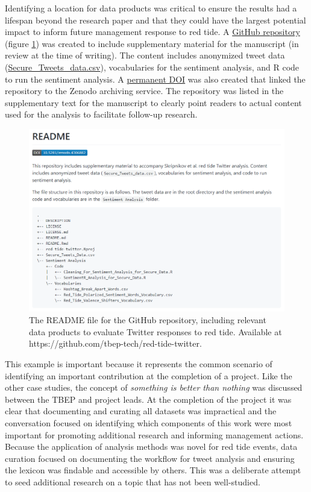 \documentclass[
]{book}
\begin{document}
Identifying a location for data products was critical to ensure the results had a lifespan beyond the research paper and that they could have the largest potential impact to inform future management response to red tide. A \href{https://github.com/tbep-tech/red-tide-twitter}{GitHub repository} (figure \ref{fig:redtidereadme}) was created to include supplementary material for the manuscript (in review at the time of writing). The content includes anonymized tweet data (\href{https://github.com/tbep-tech/red-tide-twitter/blob/master/Secure_Tweets_Data.csv}{Secure\_Tweets\_data.csv}), vocabularies for the sentiment analysis, and R code to run the sentiment analysis. A \href{https://zenodo.org/badge/latestdoi/318579178}{permanent DOI} was also created that linked the repository to the Zenodo archiving service. The repository was listed in the supplementary text for the manuscript to clearly point readers to actual content used for the analysis to facilitate follow-up research.

\begin{figure}

{\centering \includegraphics[width=0.9\linewidth]{img/redtidereadme} 

}

\caption{The README file for the GitHub repository, including relevant data products to evaluate Twitter responses to red tide. Available at https://github.com/tbep-tech/red-tide-twitter.}\label{fig:redtidereadme}
\end{figure}

This example is important because it represents the common scenario of identifying an important contribution at the completion of a project. Like the other case studies, the concept of \emph{something is better than nothing} was discussed between the TBEP and project leads. At the completion of the project it was clear that documenting and curating all datasets was impractical and the conversation focused on identifying which components of this work were most important for promoting additional research and informing management actions. Because the application of analysis methods was novel for red tide events, data curation focused on documenting the workflow for tweet analysis and ensuring the lexicon was findable and accessible by others. This was a deliberate attempt to seed additional research on a topic that has not been well-studied.
\end{document}
